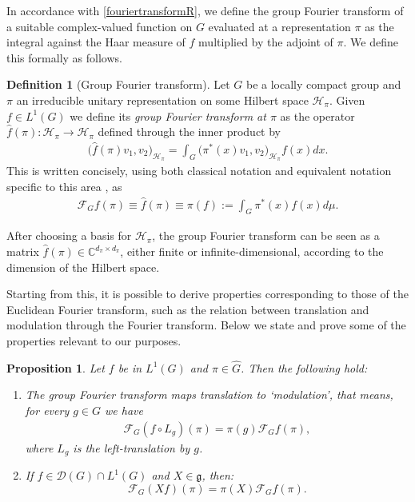 \documentclass[12pt,oneside,a4paper]{book}
\numberwithin{equation}{section}     %
\theoremstyle{plain}
\newtheorem{proposition}[theorem]{Proposition}
\theoremstyle{definition}
\newtheorem{definition}[theorem]{Definition}
\begin{document}
In accordance with \eqref{fouriertransformR}, we define the group Fourier transform of a suitable complex-valued function on $G$ evaluated at a representation $\pi$ as the integral against the Haar measure of $f$ multiplied by the adjoint of $\pi$. We define this formally as follows.
\begin{definition}[Group Fourier transform]\label{def:groupFouriertransform}
	Let $G$ be a locally compact group and $\pi$ an irreducible unitary representation on some Hilbert space $\mathcal H_\pi$. Given $f\in L^1(G)$ we define its \textit{group Fourier transform at $\pi$} as the operator $\widehat f (\pi): \mathcal H_\pi\rightarrow \mathcal H_\pi$ defined through the inner product by
	\begin{align*}
	\Big(\widehat f(\pi)v_1,v_2\Big)_{\mathcal H_\pi}=\int_G\big(\pi^*(x)v_1,v_2)_{\mathcal H_\pi}f(x)dx.
	\end{align*}
	This is written concisely, using both classical notation and equivalent notation specific to this area \cite{FR2016}, as
	\begin{align*}
	\mathcal{F}_G f(\pi)\equiv\widehat f(\pi)\equiv \pi(f):=\int_{G}\pi^*(x)f(x)d\mu.
	\end{align*}
\end{definition}

After choosing a basis for $\mathcal{H}_\pi$, the group Fourier transform can be seen as a matrix $\widehat{f}(\pi)\in \mathbb{C}^{d_\pi\times d_\pi}$, either finite or infinite-dimensional, according to the dimension of the Hilbert space. 

Starting from this, it is possible to derive properties corresponding to those of the Euclidean Fourier transform, such as the relation between translation and modulation through the Fourier transform. Below we state and prove some of the properties relevant to our purposes. 
\begin{proposition}
	\label{Prop:groupFouriertransform}
	Let $f$ be in $L^1(G)$ and $\pi\in\widehat{G}$. Then the following hold:
	\begin{enumerate}[1.]
		\item The group Fourier transform maps translation to `modulation', that means, for every $g\in G$ we have 
		\begin{align}\label{modulation}
		\mathcal{F}_G(f\circ L_g)(\pi)=\pi(g)\mathcal{F}_G f(\pi),
		\end{align}
		where $L_g$ is the left-translation by $g$.
		\item If $f\in \mathcal{D}(G)\cap L^1(G)$ and $X\in \mathfrak{g}$, then:
		\[
		\mathcal{F}_G(Xf)(\pi)=\pi(X)\mathcal{F}_Gf(\pi).
		\]
	\end{enumerate}
\end{proposition}
\end{document}
